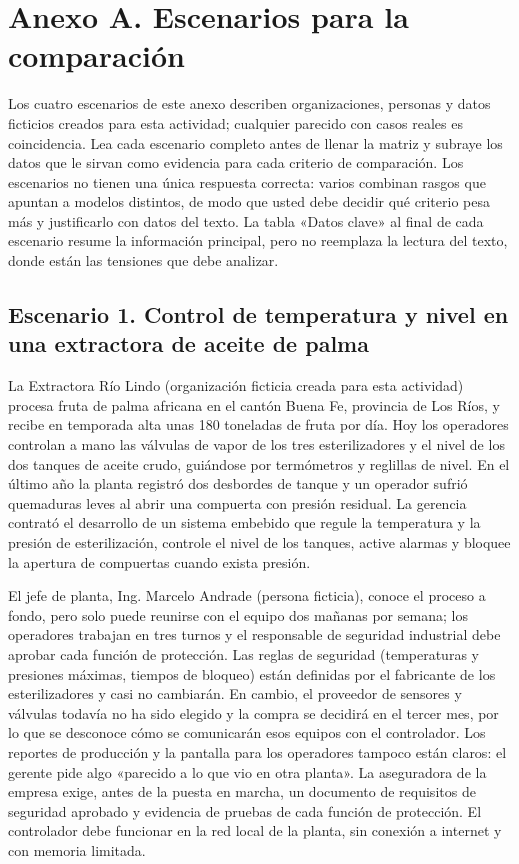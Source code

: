 \documentclass[11pt]{article}
\newcommand{\seccion}[1]{\section{\textcolor{utegreendk}{#1}}}
\newcommand{\subseccion}[1]{\subsection{\textcolor{midblue}{#1}}}
\begin{document}
\clearpage
\seccion{Anexo A. Escenarios para la comparación}

Los cuatro escenarios de este anexo describen organizaciones, personas y datos ficticios creados para esta actividad; cualquier parecido con casos reales es coincidencia. Lea cada escenario completo antes de llenar la matriz y subraye los datos que le sirvan como evidencia para cada criterio de comparación. Los escenarios no tienen una única respuesta correcta: varios combinan rasgos que apuntan a modelos distintos, de modo que usted debe decidir qué criterio pesa más y justificarlo con datos del texto. La tabla «Datos clave» al final de cada escenario resume la información principal, pero no reemplaza la lectura del texto, donde están las tensiones que debe analizar.

\subseccion{Escenario 1. Control de temperatura y nivel en una extractora de aceite de palma}

La Extractora Río Lindo (organización ficticia creada para esta actividad) procesa fruta de palma africana en el cantón Buena Fe, provincia de Los Ríos, y recibe en temporada alta unas 180 toneladas de fruta por día. Hoy los operadores controlan a mano las válvulas de vapor de los tres esterilizadores y el nivel de los dos tanques de aceite crudo, guiándose por termómetros y reglillas de nivel. En el último año la planta registró dos desbordes de tanque y un operador sufrió quemaduras leves al abrir una compuerta con presión residual. La gerencia contrató el desarrollo de un sistema embebido que regule la temperatura y la presión de esterilización, controle el nivel de los tanques, active alarmas y bloquee la apertura de compuertas cuando exista presión.

El jefe de planta, Ing. Marcelo Andrade (persona ficticia), conoce el proceso a fondo, pero solo puede reunirse con el equipo dos mañanas por semana; los operadores trabajan en tres turnos y el responsable de seguridad industrial debe aprobar cada función de protección. Las reglas de seguridad (temperaturas y presiones máximas, tiempos de bloqueo) están definidas por el fabricante de los esterilizadores y casi no cambiarán. En cambio, el proveedor de sensores y válvulas todavía no ha sido elegido y la compra se decidirá en el tercer mes, por lo que se desconoce cómo se comunicarán esos equipos con el controlador. Los reportes de producción y la pantalla para los operadores tampoco están claros: el gerente pide algo «parecido a lo que vio en otra planta». La aseguradora de la empresa exige, antes de la puesta en marcha, un documento de requisitos de seguridad aprobado y evidencia de pruebas de cada función de protección. El controlador debe funcionar en la red local de la planta, sin conexión a internet y con memoria limitada.
\end{document}
